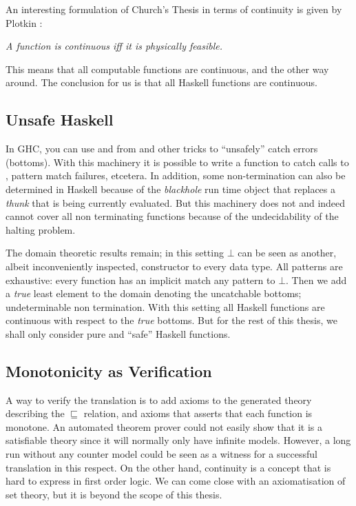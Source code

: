 An interesting formulation of Church's Thesis in terms of continuity
is given by Plotkin \cite{domains}:

\begin{center}
\emph{A function is continuous iff it is physically feasible.}
\end{center}

This means that all computable functions are continuous, and the other
way around. The conclusion for us is that all Haskell functions are
continuous.

\subsection{Unsafe Haskell}
In GHC, you can use  and  from
 and other tricks to ``unsafely'' catch errors
(bottoms). With this machinery it is possible to write a function
 to catch calls to , pattern
match failures, etcetera. In addition, some non-termination can also
be determined in Haskell because of the \emph{blackhole} run time
object that replaces a \emph{thunk} that is being currently
evaluated. But this machinery does not and indeed cannot cover all non
terminating functions because of the undecidability of the halting
problem.

The domain theoretic results remain; in this setting $\bot$ can be
seen as another, albeit inconveniently inspected, constructor to every
data type. All patterns are exhaustive: every function has an implicit
match any pattern to $\bot$.  Then we add a \emph{true} least element
to the domain denoting the uncatchable bottoms; undeterminable non
termination. With this setting all Haskell functions are continuous
with respect to the \emph{true} bottoms. But for the rest of this
thesis, we shall only consider pure and ``safe'' Haskell functions.

\subsection{Monotonicity as Verification}

A way to verify the translation is to add axioms to the generated
theory describing the $\sqsubseteq$ relation, and axioms that asserts
that each function is monotone. An automated theorem prover could not
easily show that it is a satisfiable theory since it will normally
only have infinite models. However, a long run without any counter
model could be seen as a witness for a successful translation in this
respect.  On the other hand, continuity is a concept that is hard to
express in first order logic. We can come close with an axiomatisation
of set theory, but it is beyond the scope of this thesis.
